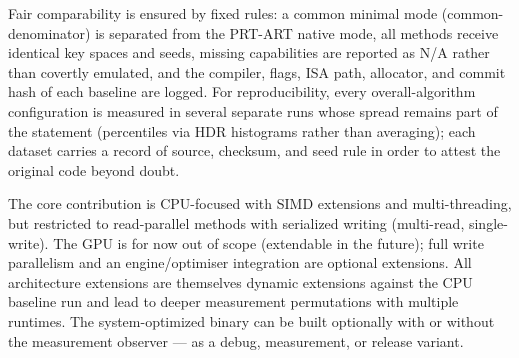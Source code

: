 Fair comparability is ensured by fixed rules: a common minimal mode (common-denominator) is
separated from the PRT-ART native mode, all methods receive identical key spaces and seeds, missing
capabilities are reported as N/A rather than covertly emulated, and the compiler, flags, ISA path,
allocator, and commit hash of each baseline are logged. For reproducibility, every
overall-algorithm configuration is measured in several separate runs whose spread remains part of
the statement (percentiles via HDR histograms rather than averaging); each dataset carries a record
of source, checksum, and seed rule in order to attest the original code beyond doubt.

The core contribution is CPU-focused with SIMD extensions and multi-threading, but restricted to
read-parallel methods with serialized writing (multi-read, single-write). The GPU is for now out of
scope (extendable in the future); full write parallelism and an engine/optimiser integration are
optional extensions. All architecture extensions are themselves dynamic extensions against the CPU
baseline run and lead to deeper measurement permutations with multiple runtimes. The
system-optimized binary can be built optionally with or without the measurement observer --- as a
debug, measurement, or release variant.
